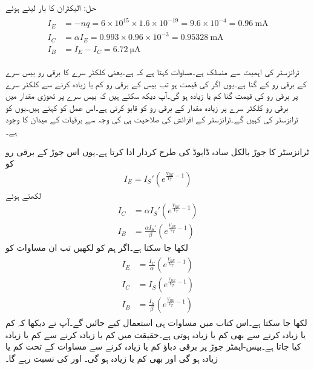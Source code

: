 حل:
	الیکٹران کا بار  لیتے ہوئے
\begin{gather}
\begin{aligned}
I_E&=-nq=6 \times 10^{15} \times 1.6 \times 10^{-19}=9.6 \times 10^{-4}=\SI{0.96}{\milli \ampere}\\
I_C&=\alpha I_E = 0.993 \times 0.96 \times 10^{-3}=\SI{0.95328}{\milli \ampere}\\
I_B&=I_E-I_C=\SI{6.72}{\micro \ampere}
\end{aligned}
\end{gather}

ٹرانزسٹر کی اہمیت  سے منسلک ہے۔مساوات   کہتا ہے کہ   ہے۔یعنی کلکٹر  سرے کا برقی رو بیس سرے کے برقی رو کے  گنا ہے۔یوں اگر  کی قیمت  ہو تب بیس کے برقی رو کم یا زیادہ کرنے سے کلکٹر  سرے پر برقی رو کی قیمت  گنا کم یا زیادہ ہو گی۔آپ دیکھ سکتے ہیں کہ بیس سرے پر تھوڑی مقدار میں برقی رو کلکٹر  سرے پر زیادہ مقدار کے برقی رو کو قابو کرتی ہے۔اس عمل کو   کہتے ہیں۔یوں  کو ٹرانزسٹر کی   کہیں گے۔ٹرانزسٹر کے افزائش کی صلاحیت ہی کی وجہ سے برقیات کے میدان کا وجود ہے۔

ٹرانزسٹر کا  جوڑ بالکل سادہ ڈایوڈ کی طرح کردار ادا کرتا ہے۔یوں اس جوڑ کے برقی رو کو
\begin{align*}
I_E=I_S' \left(e^{\frac{V_{BE}}{V_T}-1} \right)
\end{align*}
لکھتے ہوئے 
\begin{align*}
I_C&=\alpha  I_S' \left(e^{\frac{V_{BE}}{V_T}-1} \right)\\
I_B&=\frac{\alpha I_S'}{\beta} \left(e^{\frac{V_{BE}}{V_T}-1} \right)
\end{align*}
لکھا جا سکتا ہے۔اگر ہم   کو  لکھیں تب ان مساوات کو
\begin{gather}
\begin{aligned}\label{مساوات_ٹرانزسٹر_بنیادی_ڈایوڈ-مساوات}
I_E&=\frac{I_C}{\alpha} \left(e^{\frac{V_{BE}}{V_T}-1} \right)\\
I_C &= I_S \left(e^{\frac{V_{BE}}{V_T}-1} \right)\\
I_B&=\frac{I_S}{\beta} \left(e^{\frac{V_{BE}}{V_T}-1} \right)
\end{aligned}
\end{gather}
لکھا جا سکتا ہے۔اس کتاب میں مساوات  ہی استعمال کیے جائیں گے۔آپ نے دیکھا کہ  کم یا زیادہ کرنے سے  بھی کم یا زیادہ ہوتی ہے۔حقیقت میں  کم یا زیادہ کرنے سے  کم یا زیادہ کیا جاتا ہے۔بیس-ایمٹر جوڑ پر برقی دباؤ  کم یا زیادہ کرنے سے   مساوات  کے تحت کم یا زیادہ  ہو گی اور  بھی کم یا زیادہ ہو گی۔ اور  کی  نسبت  رہے گا۔

